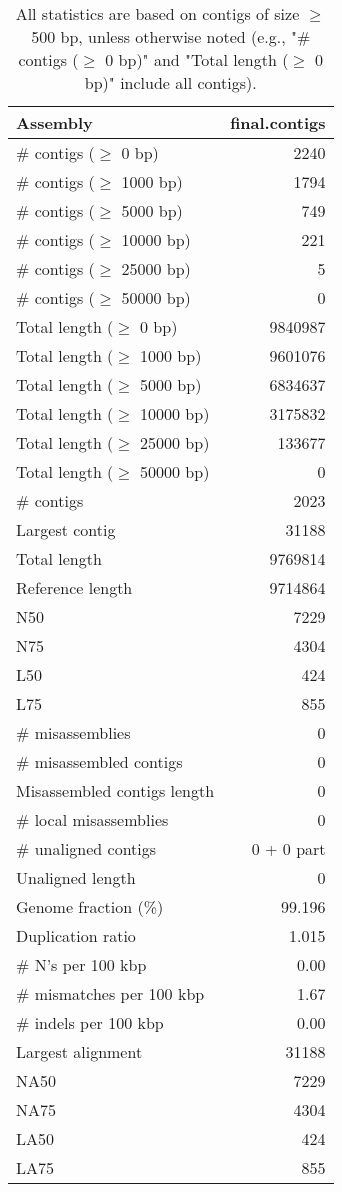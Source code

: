 \documentclass[12pt,a4paper]{article}
\begin{document}
\begin{table}[ht]
\begin{center}
\caption{All statistics are based on contigs of size $\geq$ 500 bp, unless otherwise noted (e.g., "\# contigs ($\geq$ 0 bp)" and "Total length ($\geq$ 0 bp)" include all contigs).}
\begin{tabular}{|l*{1}{|r}|}
\hline
Assembly & final.contigs \\ \hline
\# contigs ($\geq$ 0 bp) & 2240 \\ \hline
\# contigs ($\geq$ 1000 bp) & 1794 \\ \hline
\# contigs ($\geq$ 5000 bp) & 749 \\ \hline
\# contigs ($\geq$ 10000 bp) & 221 \\ \hline
\# contigs ($\geq$ 25000 bp) & 5 \\ \hline
\# contigs ($\geq$ 50000 bp) & 0 \\ \hline
Total length ($\geq$ 0 bp) & 9840987 \\ \hline
Total length ($\geq$ 1000 bp) & 9601076 \\ \hline
Total length ($\geq$ 5000 bp) & 6834637 \\ \hline
Total length ($\geq$ 10000 bp) & 3175832 \\ \hline
Total length ($\geq$ 25000 bp) & 133677 \\ \hline
Total length ($\geq$ 50000 bp) & 0 \\ \hline
\# contigs & 2023 \\ \hline
Largest contig & 31188 \\ \hline
Total length & 9769814 \\ \hline
Reference length & 9714864 \\ \hline
N50 & 7229 \\ \hline
N75 & 4304 \\ \hline
L50 & 424 \\ \hline
L75 & 855 \\ \hline
\# misassemblies & 0 \\ \hline
\# misassembled contigs & 0 \\ \hline
Misassembled contigs length & 0 \\ \hline
\# local misassemblies & 0 \\ \hline
\# unaligned contigs & 0 + 0 part \\ \hline
Unaligned length & 0 \\ \hline
Genome fraction (\%) & 99.196 \\ \hline
Duplication ratio & 1.015 \\ \hline
\# N's per 100 kbp & 0.00 \\ \hline
\# mismatches per 100 kbp & 1.67 \\ \hline
\# indels per 100 kbp & 0.00 \\ \hline
Largest alignment & 31188 \\ \hline
NA50 & 7229 \\ \hline
NA75 & 4304 \\ \hline
LA50 & 424 \\ \hline
LA75 & 855 \\ \hline
\end{tabular}
\end{center}
\end{table}
\end{document}

